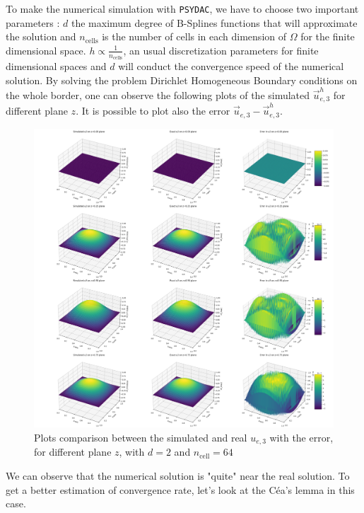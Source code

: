 \documentclass[a4paper,12pt,twoside]{report}
\begin{document}
To make the numerical simulation with \texttt{PSYDAC}, we have to choose two important parameters : $d$ the maximum degree of B-Splines functions that will approximate the solution and $n_{\text{cells}}$ is the number of cells in each dimension of $\Omega$ for the finite dimensional space. $\displaystyle h \propto \frac{1}{n_{\text{cells}}}$, an usual discretization parameters for finite dimensional spaces and $d$ will conduct the convergence speed of the numerical solution. 
By solving the problem Dirichlet Homogeneous Boundary conditions on the whole border, one can observe the following plots of the simulated $\vec u_{e,3}^h$ for different plane $z$. It is possible to plot also the error $\vec u_{e,3} - \vec u_{e,3}^h$.

\newpage

\begin{figure}
    \centering
    \includegraphics[width=0.8\linewidth]{3d_plots_degree_2_non_mixed_dirichlet_homogeneous_ncell=64.png}
    \caption{Plots comparison between the simulated and real $u_{e,3}$ with the error, for different plane $z$, with $d=2$ and $n_{\text{cell}} = 64$}
    \label{fig:3D_plots}
\end{figure}

We can observe that the numerical solution is "quite" near the real solution. To get a better estimation of convergence rate, let's look at the Céa's lemma in this case.
\end{document}
